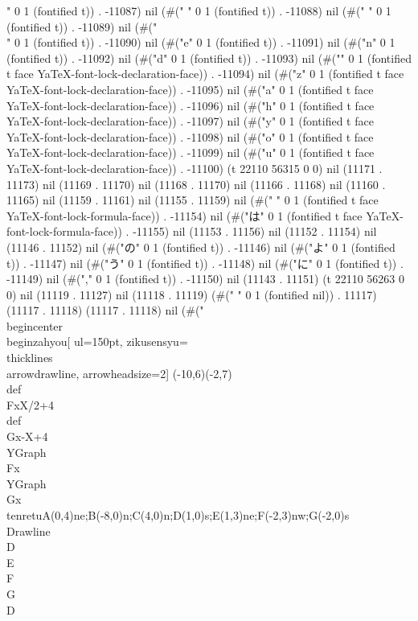 " 0 1 (fontified t)) . -11087) nil (#(" " 0 1 (fontified t)) . -11088) nil (#(" " 0 1 (fontified t)) . -11089) nil (#("\\" 0 1 (fontified t)) . -11090) nil (#("e" 0 1 (fontified t)) . -11091) nil (#("n" 0 1 (fontified t)) . -11092) nil (#("d" 0 1 (fontified t)) . -11093) nil (#("{" 0 1 (fontified t face YaTeX-font-lock-declaration-face)) . -11094) nil (#("z" 0 1 (fontified t face YaTeX-font-lock-declaration-face)) . -11095) nil (#("a" 0 1 (fontified t face YaTeX-font-lock-declaration-face)) . -11096) nil (#("h" 0 1 (fontified t face YaTeX-font-lock-declaration-face)) . -11097) nil (#("y" 0 1 (fontified t face YaTeX-font-lock-declaration-face)) . -11098) nil (#("o" 0 1 (fontified t face YaTeX-font-lock-declaration-face)) . -11099) nil (#("u" 0 1 (fontified t face YaTeX-font-lock-declaration-face)) . -11100) (t 22110 56315 0 0) nil (11171 . 11173) nil (11169 . 11170) nil (11168 . 11170) nil (11166 . 11168) nil (11160 . 11165) nil (11159 . 11161) nil (11155 . 11159) nil (#(" " 0 1 (fontified t face YaTeX-font-lock-formula-face)) . -11154) nil (#("は" 0 1 (fontified t face YaTeX-font-lock-formula-face)) . -11155) nil (11153 . 11156) nil (11152 . 11154) nil (11146 . 11152) nil (#("の" 0 1 (fontified t)) . -11146) nil (#("よ" 0 1 (fontified t)) . -11147) nil (#("う" 0 1 (fontified t)) . -11148) nil (#("に" 0 1 (fontified t)) . -11149) nil (#("," 0 1 (fontified t)) . -11150) nil (11143 . 11151) (t 22110 56263 0 0) nil (11119 . 11127) nil (11118 . 11119) (#(" " 0 1 (fontified nil)) . 11117) (11117 . 11118) (11117 . 11118) nil (#("\\begin{center}
  \\begin{zahyou}[%
   ul=150pt,%
   zikusensyu=\\thicklines\\arrowdrawline,%
   arrowheadsize=2]
   (-10,6)(-2,7)%
   \\def\\Fx{X/2+4}
   \\def\\Gx{-X+4}
   \\YGraph\\Fx
   \\YGraph\\Gx
   \\tenretu{A(0,4)ne;B(-8,0)n;C(4,0)n;D(1,0)s;E(1,3)ne;F(-2,3)nw;G(-2,0)s}
   \\Drawline{\\D\\E\\F\\G\\D}
}
